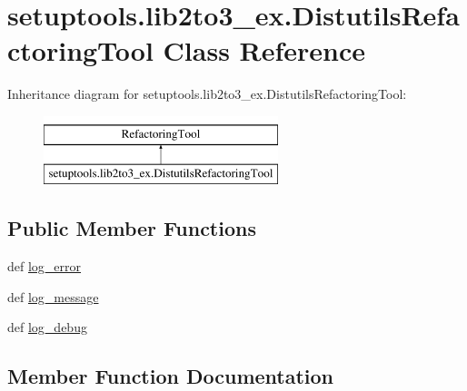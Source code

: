 \hypertarget{classsetuptools_1_1lib2to3__ex_1_1DistutilsRefactoringTool}{}\section{setuptools.\+lib2to3\+\_\+ex.\+Distutils\+Refactoring\+Tool Class Reference}
\label{classsetuptools_1_1lib2to3__ex_1_1DistutilsRefactoringTool}
Inheritance diagram for setuptools.\+lib2to3\+\_\+ex.\+Distutils\+Refactoring\+Tool\+:\begin{figure}[H]
\begin{center}
\leavevmode
\includegraphics[height=2.000000cm]{classsetuptools_1_1lib2to3__ex_1_1DistutilsRefactoringTool}
\end{center}
\end{figure}
\subsection*{Public Member Functions}
\begin{DoxyCompactItemize}
\item 
def \hyperlink{classsetuptools_1_1lib2to3__ex_1_1DistutilsRefactoringTool_a6329ab8f0baf8de6048997a3bd72e239}{log\+\_\+error}
\item 
def \hyperlink{classsetuptools_1_1lib2to3__ex_1_1DistutilsRefactoringTool_a04e5dd1cec287ab02da50ec42175897e}{log\+\_\+message}
\item 
def \hyperlink{classsetuptools_1_1lib2to3__ex_1_1DistutilsRefactoringTool_a050f1739b3a37902373d20c4ba4923bc}{log\+\_\+debug}
\end{DoxyCompactItemize}


\subsection{Member Function Documentation}
\hypertarget{classsetuptools_1_1lib2to3__ex_1_1DistutilsRefactoringTool_a050f1739b3a37902373d20c4ba4923bc}{}

